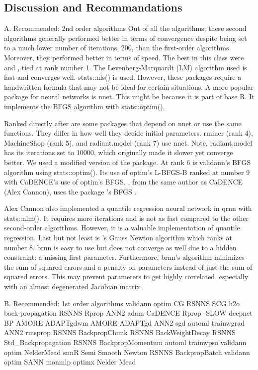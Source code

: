 \hypertarget{discussion-and-recommandations}{%
\subsection{Discussion and
Recommandations}\label{discussion-and-recommandations}}

A. Recommended: 2nd order algorithms Out of all the algorithms, these
second algorithms generally performed better in terms of convergence
despite being set to a much lower number of iterations, 200, than the
first-order algorithms. Moreover, they performed better in terms of
speed. The best in this class were  and
, tied at rank number 1. The Levenberg-Marquardt (LM)
algorithm used is fast and converges well. stats::nls() is used.
However, these packages require a handwritten formula that may not be
ideal for certain situations. A more popular package for neural networks
is nnet. This might be because it is part of base R. It implements the
BFGS algorithm with stats::optim().

Ranked directly after are some packages that depend on nnet or use the
same functions. They differ in how well they decide initial parameters.
rminer (rank 4), MachineShop (rank 5), and radiant.model (rank 7) use
nnet. Note, radiant.model has its iterations set to 10000, which
originally made it slower yet converge better. We used a modified
version of the package. At rank 6 is validann's BFGS algorithm using
stats::optim(). Its use of optim's L-BFGS-B ranked at number 9 with
CaDENCE's use of optim's BFGS. , from the same author as
CaDENCE (Alex Cannon), uses the package 's BFGS
\citep{R-optimx}.

Alex Cannon also implemented a quantile regression neural network in
qrnn with stats::nlm(). It requires more iterations and is not as fast
compared to the other second-order algorithms. However, it is a valuable
implementation of quantile regression. Last but not least is
's Gauss Newton algorithm which ranks at number 8. brnn is
easy to use but does not converge as well due to a hidden constraint: a
missing first parameter. Furthermore, brnn's algorithm minimizes the sum
of squared errors and a penalty on parameters instead of just the sum of
squared errors. This may prevent parameters to get highly correlated,
especially with an almost degenerated Jacobian matrix.

B. Recommended: 1st order algorithms validann optim CG RSNNS SCG h2o
back-propagation RSNNS Rprop ANN2 adam CaDENCE Rprop -SLOW deepnet BP
AMORE ADAPTgdwm AMORE ADAPTgd ANN2 sgd automl trainwgrad ANN2 rmsprop
RSNNS BackpropChunk RSNNS BackWeightDecay RSNNS Std\_Backpropagation
RSNNS BackpropMomentum automl trainwpso validann optim NelderMead snnR
Semi Smooth Newton RSNNS BackpropBatch validann optim SANN monmlp optimx
Nelder Mead

